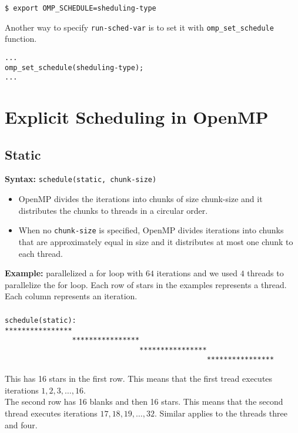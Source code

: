 \documentclass[paper=letter, fontsize=12pt]{article}
\begin{document}
\begin{verbatim}
$ export OMP_SCHEDULE=sheduling-type
\end{verbatim}

Another way to specify \verb|run-sched-var| is to set it with \verb|omp_set_schedule| function.

\begin{verbatim}
...
omp_set_schedule(sheduling-type);
...
\end{verbatim}

\section{Explicit Scheduling in OpenMP}
\subsection{Static}
\textbf{Syntax:} \verb|schedule(static, chunk-size)|
\begin{itemize}
    \item OpenMP divides the iterations into chunks of size chunk-size and it distributes the chunks to threads in a circular order.
    \item When no \verb|chunk-size| is specified, OpenMP divides iterations into chunks that are approximately equal in size and it distributes at most one chunk to each thread.
\end{itemize}
\textbf{Example:} parallelized a for loop with $ 64 $ iterations and we used $ 4 $ threads to parallelize the for loop. Each row of stars in the examples represents a thread. Each column represents an iteration.
\subsubsection{}
\begin{verbatim}
schedule(static):      
****************                                                
                ****************                                
                                ****************                
                                                ****************
\end{verbatim}
This has 16 stars in the first row. This means that the first tread executes iterations $ 1, 2, 3, \dots, 16 $. 
\\The second row has 16 blanks and then 16 stars. This means that the second thread executes iterations $ 17, 18, 19, \dots, 32$. Similar applies to the threads three and four.
\end{document}
